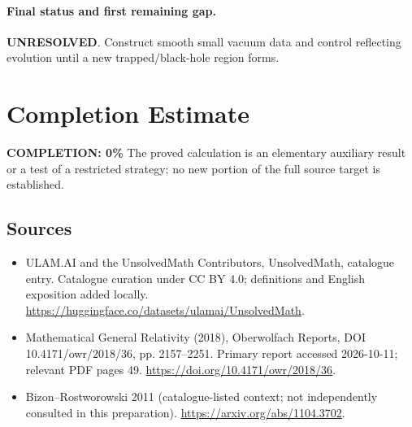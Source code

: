 \documentclass[11pt]{article}
\begin{document}
\paragraph{Final status and first remaining gap.}
\textbf{UNRESOLVED}. Construct smooth small vacuum data and control reflecting evolution until a new trapped/black-hole region forms.

\section{Completion Estimate}
\noindent\textbf{COMPLETION: 0\%}
The proved calculation is an elementary auxiliary result or a test of a restricted strategy; no new portion of the full source target is established.

\subsection{Sources}
\begin{itemize}
\item[\hypertarget{source:statement:1}{S1}] ULAM.AI and the UnsolvedMath Contributors, UnsolvedMath, catalogue entry. Catalogue curation under CC BY 4.0; definitions and English exposition added locally.
\url{https://huggingface.co/datasets/ulamai/UnsolvedMath}.
\item[\hypertarget{source:statement:2}{S2}] Mathematical General Relativity (2018), Oberwolfach Reports, DOI 10.4171/owr/2018/36, pp. 2157--2251. Primary report accessed 2026-10-11; relevant PDF pages 49.
\url{https://doi.org/10.4171/owr/2018/36}.
\item[\hypertarget{source:statement:3}{S3}] Bizon--Rostworowski 2011 (catalogue-listed context; not independently consulted in this preparation).
\url{https://arxiv.org/abs/1104.3702}.
\end{itemize}
\label{end:statement}
\end{document}
